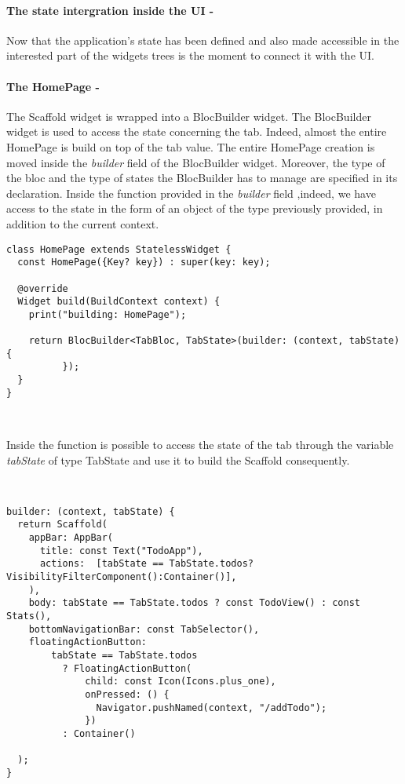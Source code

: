 \paragraph{The state intergration inside the UI - }
\label{subpar:todo_app_bloc_core_state}
Now that the application's state has been defined and also made accessible in the interested part of the widgets trees is the moment to connect it with the UI.

\paragraph{The HomePage - }
\label{subpar:todo_app_bloc_core_state}

The Scaffold widget is wrapped into a BlocBuilder widget. The BlocBuilder widget is used to access the state concerning the tab. Indeed, almost the entire HomePage is build on top of the tab value. The entire HomePage creation is moved inside the \textit{builder} field of the BlocBuilder widget. Moreover, the type of the bloc and the type of states the BlocBuilder has to manage are specified in its declaration. Inside the function provided in the \textit{builder} field ,indeed, we have access to the state in the form of an object of the type previously provided, in addition to the current context.
\begin{code}
\mbox{}
 \mbox{}
\label{code:2.14}
\begin{verbatim}
class HomePage extends StatelessWidget {
  const HomePage({Key? key}) : super(key: key);

  @override
  Widget build(BuildContext context) {
    print("building: HomePage");

    return BlocBuilder<TabBloc, TabState>(builder: (context, tabState) {
          });
  }
}
\end{verbatim}
\mbox{}\
\end{code}
Inside the function is possible to access the state of the tab through the variable \textit{tabState} of type TabState and use it to build the Scaffold consequently.
\begin{code}
\mbox{}\\
 \mbox{}
\label{code:2.14}
\begin{verbatim}
builder: (context, tabState) {
  return Scaffold(
    appBar: AppBar(
      title: const Text("TodoApp"),
      actions:  [tabState == TabState.todos?   VisibilityFilterComponent():Container()],
    ),
    body: tabState == TabState.todos ? const TodoView() : const Stats(),
    bottomNavigationBar: const TabSelector(),
    floatingActionButton:
        tabState == TabState.todos
          ? FloatingActionButton(
              child: const Icon(Icons.plus_one),
              onPressed: () {
                Navigator.pushNamed(context, "/addTodo");
              })
          : Container()

  );
}
\end{verbatim}
\mbox{}
\end{code}
